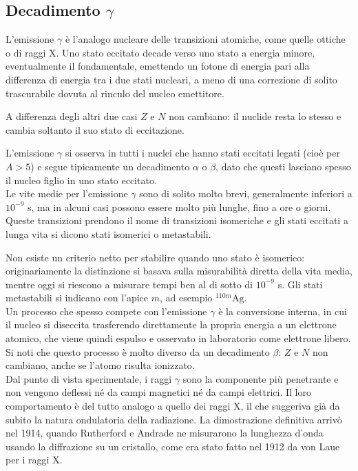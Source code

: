 \subsection{Decadimento $\gamma$}

L'emissione $\gamma$ è l'analogo nucleare delle transizioni atomiche, come quelle ottiche o di raggi X. Uno stato eccitato decade verso uno stato a energia minore, eventualmente il fondamentale, emettendo un fotone di energia pari alla differenza di energia tra i due stati nucleari, a meno di una correzione di solito trascurabile dovuta al rinculo del nucleo emettitore. 

A differenza degli altri due casi $Z$ e $N$ non cambiano: il nuclide resta lo stesso e cambia soltanto il suo stato di eccitazione. 

L'emissione $\gamma$ si osserva in tutti i nuclei che hanno stati eccitati legati (cioè per $A > 5$) e segue tipicamente un decadimento $\alpha$ o $\beta$, dato che questi lasciano spesso il nucleo figlio in uno stato eccitato.\\

Le vite medie per l'emissione $\gamma$ sono di solito molto brevi, generalmente inferiori a $10^{-9}$ s, ma in alcuni casi possono essere molto più lunghe, fino a ore o giorni. Queste transizioni prendono il nome di transizioni isomeriche e gli stati eccitati a lunga vita si dicono stati isomerici o metastabili. 

Non esiste un criterio netto per stabilire quando uno stato è isomerico: originariamente la distinzione si basava sulla misurabilità diretta della vita media, mentre oggi si riescono a misurare tempi ben al di sotto di $10^{-9}$ s. Gli stati metastabili si indicano con l'apice $m$, ad esempio ${}^{110m}\mathrm{Ag}$.\\

Un processo che spesso compete con l'emissione $\gamma$ è la conversione interna, in cui il nucleo si diseccita trasferendo direttamente la propria energia a un elettrone atomico, che viene quindi espulso e osservato in laboratorio come elettrone libero. Si noti che questo processo è molto diverso da un decadimento $\beta$: $Z$ e $N$ non cambiano, anche se l'atomo risulta ionizzato.\\

Dal punto di vista sperimentale, i raggi $\gamma$ sono la componente più penetrante e non vengono deflessi né da campi magnetici né da campi elettrici. Il loro comportamento è del tutto analogo a quello dei raggi X, il che suggeriva già da subito la natura ondulatoria della radiazione. La dimostrazione definitiva arrivò nel 1914, quando Rutherford e Andrade ne misurarono la lunghezza d'onda usando la diffrazione su un cristallo, come era stato fatto nel 1912 da von Laue per i raggi X.

